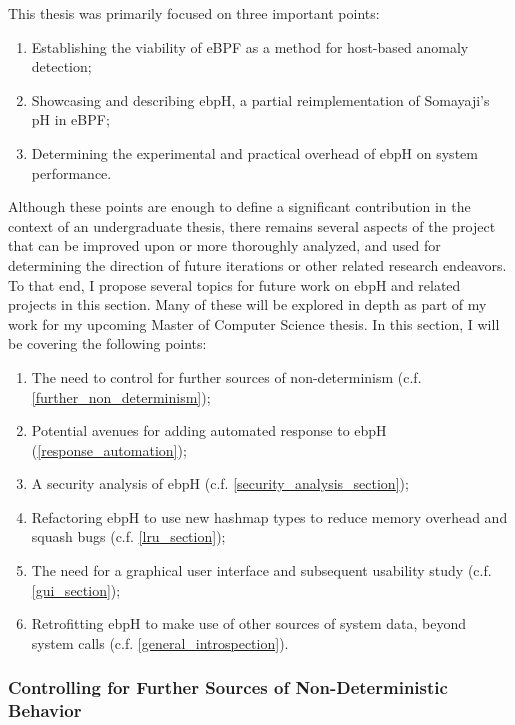\documentclass[
  12pt]{findlay}
\providecommand{\tightlist}{\setlength{\itemsep}{0pt}\setlength{\parskip}{0pt}}
\begin{document}
This thesis was primarily focused on three important points:

\begin{enumerate}
\def\labelenumi{\arabic{enumi})}
\tightlist
\item
  Establishing the viability of eBPF as a method for host-based anomaly
  detection;
\item
  Showcasing and describing ebpH, a partial reimplementation of
  Somayaji's pH \autocite{soma02} in eBPF;
\item
  Determining the experimental and practical overhead of ebpH on system
  performance.
\end{enumerate}

Although these points are enough to define a significant contribution in
the context of an undergraduate thesis, there remains several aspects of
the project that can be improved upon or more thoroughly analyzed, and
used for determining the direction of future iterations or other related
research endeavors. To that end, I propose several topics for future
work on ebpH and related projects in this section. Many of these will be
explored in depth as part of my work for my upcoming Master of Computer
Science thesis. In this section, I will be covering the following
points:

\begin{enumerate}
\def\labelenumi{\arabic{enumi})}
\tightlist
\item
  The need to control for further sources of non-determinism (c.f.
  \autoref{further_non_determinism});
\item
  Potential avenues for adding automated response to ebpH
  (\autoref{response_automation});
\item
  A security analysis of ebpH (c.f.
  \autoref{security_analysis_section});
\item
  Refactoring ebpH to use new hashmap types to reduce memory overhead
  and squash bugs (c.f. \autoref{lru_section});
\item
  The need for a graphical user interface and subsequent usability study
  (c.f. \autoref{gui_section});
\item
  Retrofitting ebpH to make use of other sources of system data, beyond
  system calls (c.f. \autoref{general_introspection}).
\end{enumerate}

\hypertarget{controlling-for-further-sources-of-non-deterministic-behavior}{%
\subsubsection{Controlling for Further Sources of Non-Deterministic
Behavior}\label{controlling-for-further-sources-of-non-deterministic-behavior}}
\end{document}
